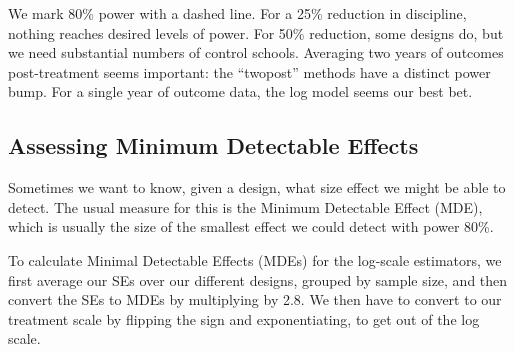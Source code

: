 \documentclass[
]{book}
\begin{document}
We mark 80\% power with a dashed line. For a 25\% reduction in discipline, nothing reaches desired levels of power.
For 50\% reduction, some designs do, but we need substantial numbers of control schools.
Averaging two years of outcomes post-treatment seems important: the ``twopost'' methods have a distinct power bump.
For a single year of outcome data, the log model seems our best bet.

\subsection{Assessing Minimum Detectable Effects}\label{assessing-minimum-detectable-effects}

Sometimes we want to know, given a design, what size effect we might be able to detect.
The usual measure for this is the Minimum Detectable Effect (MDE), which is usually the size of the smallest effect we could detect with power 80\%.

To calculate Minimal Detectable Effects (MDEs) for the log-scale estimators,
we first average our SEs over our different designs, grouped by sample size, and then convert the SEs to MDEs by multiplying by 2.8.
We then have to convert to our treatment scale by flipping the sign and exponentiating, to get out of the log scale.
\end{document}
